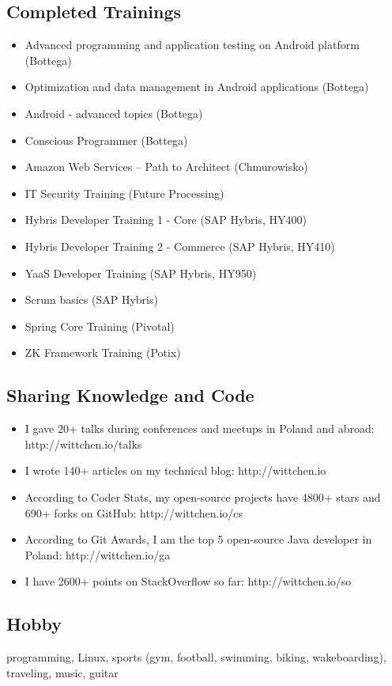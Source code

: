 \documentclass{article}
\begin{document}
    \subsection*{Completed Trainings}
    \begin{itemize}
      \item Advanced programming and application testing on Android platform (Bottega)
      \item Optimization and data management in Android applications (Bottega)
      \item Android - advanced topics (Bottega)
      \item Conscious Programmer (Bottega)
      \item Amazon Web Services – Path to Architect (Chmurowisko)
      \item IT Security Training (Future Processing)
      \item Hybris Developer Training 1 - Core (SAP Hybris, HY400)
      \item Hybris Developer Training 2 - Commerce (SAP Hybris, HY410)
      \item YaaS Developer Training (SAP Hybris, HY950)
      \item Scrum basics (SAP Hybris)
      \item Spring Core Training (Pivotal)
      \item ZK Framework Training (Potix)
    \end{itemize}

    \subsection*{Sharing Knowledge and Code}
    \begin{itemize}
      \item I gave 20+ talks during conferences and meetups in Poland and abroad: http://wittchen.io/talks
      \item I wrote 140+ articles on my technical blog: http://wittchen.io
      \item According to Coder Stats, my open-source projects have 4800+ stars and 690+ forks on GitHub: http://wittchen.io/cs
      \item According to Git Awards, I am the top 5 open-source Java developer in Poland: http://wittchen.io/ga
      \item I have 2600+ points on StackOverflow so far: http://wittchen.io/so
    \end{itemize}

    \subsection*{Hobby}
    programming, Linux, sports (gym, football, swimming, biking, wakeboarding), traveling, music, guitar
\end{document}

